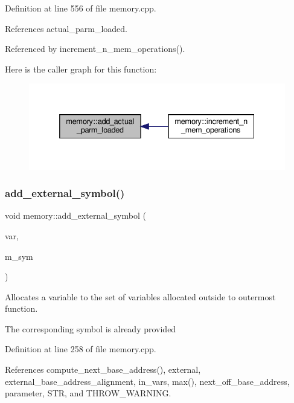 Definition at line 556 of file memory.\+cpp.



References actual\+\_\+parm\+\_\+loaded.



Referenced by increment\+\_\+n\+\_\+mem\+\_\+operations().

Here is the caller graph for this function\+:
\nopagebreak
\begin{figure}[H]
\begin{center}
\leavevmode
\includegraphics[width=332pt]{d8/d99/classmemory_a3df806662ba923a3bf6d8608acae5048_icgraph}
\end{center}
\end{figure}
\mbox{\label{classmemory_afc9ff45301d4dbbb7f5a840155f74402}} 
\subsubsection{\texorpdfstring{add\+\_\+external\+\_\+symbol()}{add\_external\_symbol()}}
{\footnotesize\ttfamily void memory\+::add\+\_\+external\+\_\+symbol (\begin{DoxyParamCaption}\item[{unsigned int}]{var,  }\item[{const \hyperlink{memory__symbol_8hpp_af3608dbc27177447c2d777fa712cc82a}{memory\+\_\+symbol\+Ref}}]{m\+\_\+sym }\end{DoxyParamCaption})}



Allocates a variable to the set of variables allocated outside to outermost function. 

The corresponding symbol is already provided 

Definition at line 258 of file memory.\+cpp.



References compute\+\_\+next\+\_\+base\+\_\+address(), external, external\+\_\+base\+\_\+address\+\_\+alignment, in\+\_\+vars, max(), next\+\_\+off\+\_\+base\+\_\+address, parameter, S\+TR, and T\+H\+R\+O\+W\+\_\+\+W\+A\+R\+N\+I\+NG.



